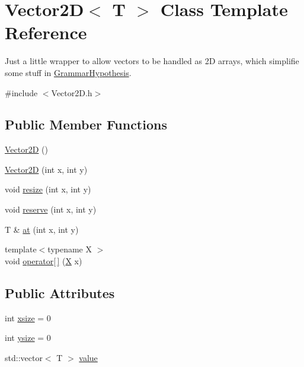 \hypertarget{struct_vector2_d}{}\section{Vector2D$<$ T $>$ Class Template Reference}
\label{struct_vector2_d}


Just a little wrapper to allow vectors to be handled as 2D arrays, which simplifie some stuff in \hyperlink{class_grammar_hypothesis}{Grammar\+Hypothesis}.  




{\ttfamily \#include $<$Vector2\+D.\+h$>$}

\subsection*{Public Member Functions}
\begin{DoxyCompactItemize}
\item 
\hyperlink{struct_vector2_d_a96580267fed7cd6686cbbf8e11048023}{Vector2D} ()
\item 
\hyperlink{struct_vector2_d_a9addb650ad17e59bfc240018508157db}{Vector2D} (int x, int y)
\item 
void \hyperlink{struct_vector2_d_a686acefeb363d68e106fb4a951069a85}{resize} (int x, int y)
\item 
void \hyperlink{struct_vector2_d_af891f05ae5cdfbe8d5c8f436ae04dc98}{reserve} (int x, int y)
\item 
T \& \hyperlink{struct_vector2_d_a3394ac993a4bb0ee570fc4ed2f6357e3}{at} (int x, int y)
\item 
{\footnotesize template$<$typename X $>$ }\\void \hyperlink{struct_vector2_d_a73716695119afd405ffea6afd42391c0}{operator\mbox{[}$\,$\mbox{]}} (\hyperlink{_ops_8h_a588e6b56097e045c733b60d25c4d45aba02129bb861061d1a052c592e2dc6b383}{X} x)
\end{DoxyCompactItemize}
\subsection*{Public Attributes}
\begin{DoxyCompactItemize}
\item 
int \hyperlink{struct_vector2_d_a2183b46128acb0a2abc12242a2d08d3c}{xsize} = 0
\item 
int \hyperlink{struct_vector2_d_a76a4280e708834f08e6f294f9171c6f3}{ysize} = 0
\item 
std\+::vector$<$ T $>$ \hyperlink{struct_vector2_d_a6c97eca85f7330f9773a248bbd268b7d}{value}
\end{DoxyCompactItemize}


